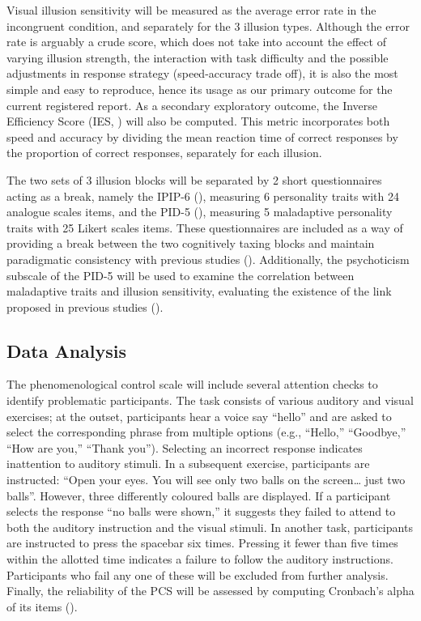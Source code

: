 \documentclass[
  man,
  floatsintext,
  longtable,
  nolmodern,
  notxfonts,
  notimes,
  colorlinks=true,linkcolor=blue,citecolor=blue,urlcolor=blue]{apa7}
\begin{document}
Visual illusion sensitivity will be measured as the average error rate
in the incongruent condition, and separately for the 3 illusion types.
Although the error rate is arguably a crude score, which does not take
into account the effect of varying illusion strength, the interaction
with task difficulty and the possible adjustments in response strategy
(speed-accuracy trade off), it is also the most simple and easy to
reproduce, hence its usage as our primary outcome for the current
registered report. As a secondary exploratory outcome, the Inverse
Efficiency Score (IES, ) will also be computed. This metric incorporates both speed
and accuracy by dividing the mean reaction time of correct responses by
the proportion of correct responses, separately for each illusion.

The two sets of 3 illusion blocks will be separated by 2 short
questionnaires acting as a break, namely the IPIP-6
(), measuring 6
personality traits with 24 analogue scales items, and the PID-5
(), measuring 5
maladaptive personality traits with 25 Likert scales items. These
questionnaires are included as a way of providing a break between the
two cognitively taxing blocks and maintain paradigmatic consistency with
previous studies ().
Additionally, the psychoticism subscale of the PID-5 will be used to
examine the correlation between maladaptive traits and illusion
sensitivity, evaluating the existence of the link proposed in previous
studies ().

\subsection{Data Analysis}\label{data-analysis}

The phenomenological control scale will include several attention checks
to identify problematic participants. The task consists of various
auditory and visual exercises; at the outset, participants hear a voice
say ``hello'' and are asked to select the corresponding phrase from
multiple options (e.g., ``Hello,'' ``Goodbye,'' ``How are you,'' ``Thank
you''). Selecting an incorrect response indicates inattention to
auditory stimuli. In a subsequent exercise, participants are instructed:
``Open your eyes. You will see only two balls on the screen\ldots{} just
two balls''. However, three differently coloured balls are displayed. If
a participant selects the response ``no balls were shown,'' it suggests
they failed to attend to both the auditory instruction and the visual
stimuli. In another task, participants are instructed to press the
spacebar six times. Pressing it fewer than five times within the
allotted time indicates a failure to follow the auditory instructions.
Participants who fail any one of these will be excluded from further
analysis. Finally, the reliability of the PCS will be assessed by
computing Cronbach's alpha of its items
().
\end{document}
